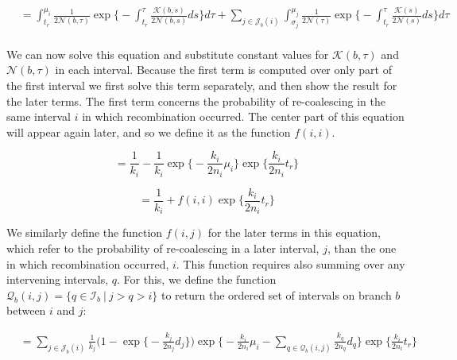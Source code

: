 \documentclass[11pt]{article}
\begin{document}
\begin{equation}
\begin{aligned}
	&= \int_{t_r}^{\mu_i}
		\frac{1}{2\mathcal{N}(b,\tau)} \exp 
			\bigg\{
				-\int_{t_r}^{\tau} \frac{\mathcal{K}(b,s)}{2\mathcal{N}(b,s)}ds
			\bigg\} d\tau + 
			\sum_{j \in \mathcal{J}_b(i)}
			\int_{\sigma_j}^{\mu_j}
			\frac{1}{2\mathcal{N}(\tau)} \exp 
			\bigg\{
				-\int_{t_r}^{\tau}
				\frac{\mathcal{K}(s)}{2\mathcal{N}(s)}ds
			\bigg\} d\tau\\
\end{aligned}			
\end{equation}


\noindent We can now solve this equation and substitute constant values for 
$\mathcal{K}(b,\tau)$ and $\mathcal{N}(b,\tau)$ in each interval. 
Because the first term is computed over only part of the first interval we 
first solve this term separately, and then show the result for the later terms.
The first term concerns the probability of re-coalescing in the same interval 
$i$ in which recombination occurred. The center part of this equation will 
appear again later, and so we define it as the function $f(i,i)$.

\begin{equation}
	= \frac{1}{k_i} - 
	  \frac{1}{k_i}
	  \exp \bigg\{-\frac{k_i}{2n_i} \mu_i \bigg\}
	  \exp \bigg\{\frac{k_i}{2n_i} t_r \bigg\}
\end{equation}

\begin{equation}
	= \frac{1}{k_i} + f(i,i) \exp \bigg\{\frac{k_i}{2n_i} t_r \bigg\}
\end{equation}


\noindent We similarly define the function $f(i,j)$ for the later terms in 
this equation, which refer to the  
probability of re-coalescing in a later interval, $j$, than the one 
in which recombination occurred, $i$. This function requires also summing over 
any intervening intervals, $q$. For this, we define the function 
$\mathcal{Q}_b(i,j) = \{q \in \mathcal{I}_b ~|~ j > q > i\}$
to return the ordered set of intervals on branch $b$ between $i$ and $j$: 


\begin{equation}
\begin{aligned}
	&= \sum_{j \in \mathcal{J}_b(i)} 
	  \frac{1}{k_j}
	  \bigg(1 - \exp 
		  \bigg\{
			  -\frac{k_j}{2n_j} d_j 
		  \bigg\}
	  \bigg)
	  \exp \bigg\{
		  -\frac{k_i}{2n_i} \mu_i - 
		  \sum_{q \in \mathcal{Q}_b(i,j)}
		  \frac{k_q}{2n_q} d_q
		  \bigg\}
	  \exp \bigg\{
		  \frac{k_i}{2n_i} t_r
		  \bigg\}\\
\end{aligned}
\end{equation}
\end{document}
